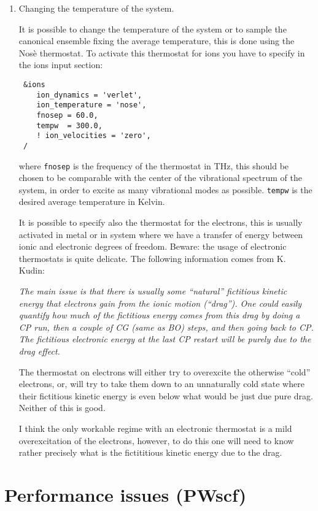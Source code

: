 \documentclass[12pt,a4paper]{article}
\begin{document}
\begin{enumerate}
  \item
    Changing the temperature of the system.

    It is possible to change the temperature of the system or to
    sample the canonical ensemble fixing the average temperature, this
    is done using the Nos\`e thermostat.
    To activate this thermostat for ions you have to specify in the
    ions input section:
\begin{verbatim}
 &ions
    ion_dynamics = 'verlet',
    ion_temperature = 'nose',
    fnosep = 60.0,
    tempw  = 300.0,
    ! ion_velocities = 'zero',
 /
\end{verbatim}
    where \texttt{fnosep} is the frequency of the thermostat in THz,
    this should be chosen to be comparable with the center of the
    vibrational spectrum of the system, in order to excite as many
    vibrational modes as possible.
    \texttt{tempw} is the desired average temperature in Kelvin.

    It is possible to specify also the thermostat for the electrons,
    this is usually activated in metal or in system where we have a
    transfer of energy between ionic and electronic degrees of
    freedom. Beware: the usage of electronic thermostats is quite
    delicate. The following information comes from K. Kudin:
    {\em The main issue is that there is usually some ``natural'' fictitious
    kinetic energy that electrons gain from the ionic motion (``drag''). One
    could easily quantify how much of the fictitious energy comes from this
    drag by doing a CP run, then a couple of CG (same as BO) steps, and
    then going back to CP. The fictitious electronic energy at the last CP
    restart will be purely due to the drag effect.

    The thermostat on electrons will either try to overexcite the
    otherwise ``cold'' electrons, or, will try to take them down to an
    unnaturally cold state where their fictitious kinetic energy is even
    below what would be just due pure drag. Neither of this is good.

    I think the only workable regime with an electronic thermostat is a
    mild overexcitation of the electrons, however, to do this one will need
    to know rather precisely what is the fictititious kinetic energy due to
    the drag.}

\end{enumerate}


\clearpage

\section{Performance issues (PWscf)}
  \label{performance}
\end{document}
